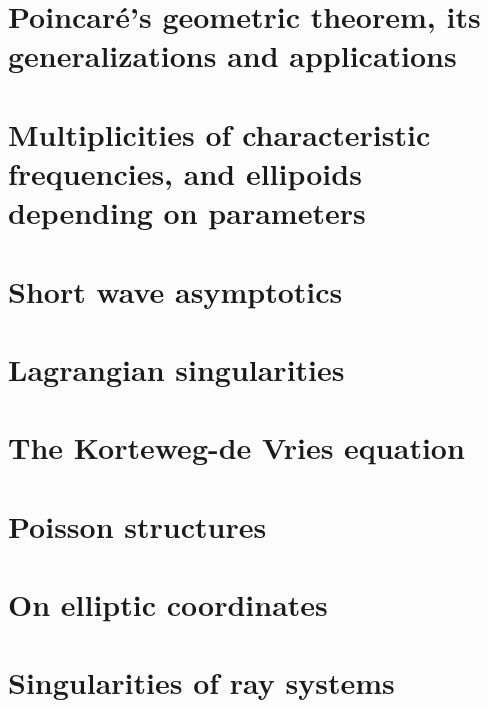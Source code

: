 \documentclass{book}
\numberwithin{equation}{section}
\theoremstyle{plain}
\theoremstyle{definition}
\theoremstyle{remark}
\theoremstyle{remark}
\begin{document}
\chapter{Poincar\'e's geometric theorem, its generalizations and
applications}

\chapter{Multiplicities of characteristic frequencies, and ellipoids
depending on parameters}

\chapter{Short wave asymptotics}

\chapter{Lagrangian singularities}

\chapter{The Korteweg-de Vries equation}

\chapter{Poisson structures}

\chapter{On elliptic coordinates}

\chapter{Singularities of ray systems}
\end{document}

